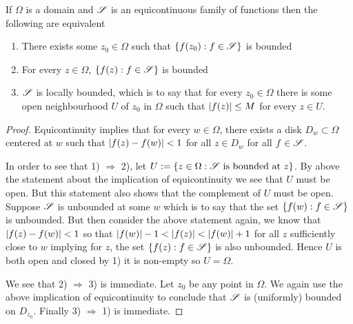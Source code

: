\begin{proposition}\label{prop:equicont-gives-unif-bound}
    If $\Omega$ is a domain and $\mathscr{S}$ is an equicontinuous family of functions then the following are equivalent
    \begin{enumerate}
        \item There exists some $z_0 \in \Omega$ such that $\{f(z_0): f \in \mathscr{S}\}$ is bounded
        \item For every $z \in \Omega$, $\{f(z): f \in \mathscr{S}\}$ is bounded
        \item $\mathscr{S}$ is locally bounded, which is to say that for every $z_0 \in \Omega$ there is some open neighbourhood $U$ of $z_0$ in $\Omega$ such that $\left|f(z)\right| \leq M$ for every $z \in U$.
    \end{enumerate}
\end{proposition}
\begin{proof}
    Equicontinuity implies that for every $w \in \Omega$, there exists a disk $D_w \subset \Omega$ centered at $w$ such that $\left|f(z) - f(w)\right| < 1$ for all $z \in D_w$ for all $f \in \mathscr{S}$.

    In order to see that 1) $\Rightarrow$ 2), let $U := \{z \in \Omega: \mathscr{S} \text{ is bounded at }z\}$. By above the statement about the implication of equicontinuity we see that $U$ must be open. But this statement also shows that the complement of $U$ must be open. Suppose $\mathscr{S}$ is unbounded at some $w$ which is to say that the set $\{f(w): f \in \mathscr{S}\}$ is unbounded. But then consider the above statement again, we know that $\left|f(z) - f(w)\right| < 1$ so that $\left|f(w)\right| - 1 < \left|f(z)\right| < \left|f(w)\right| + 1$ for all $z$ sufficiently close to $w$ implying for $z$, the set $\{f(z): f \in \mathscr{S}\}$ is also unbounded. Hence $U$ is both open and closed by 1) it is non-empty so $U = \Omega$.

    We see that 2) $\Rightarrow$ 3) is immediate. Let $z_0$ be any point in $\Omega$. We again use the above implication of equicontinuity to conclude that $\mathscr{S}$ is (uniformly) bounded on $D_{z_0}$. Finally 3) $\Rightarrow$ 1) is immediate.
\end{proof}

